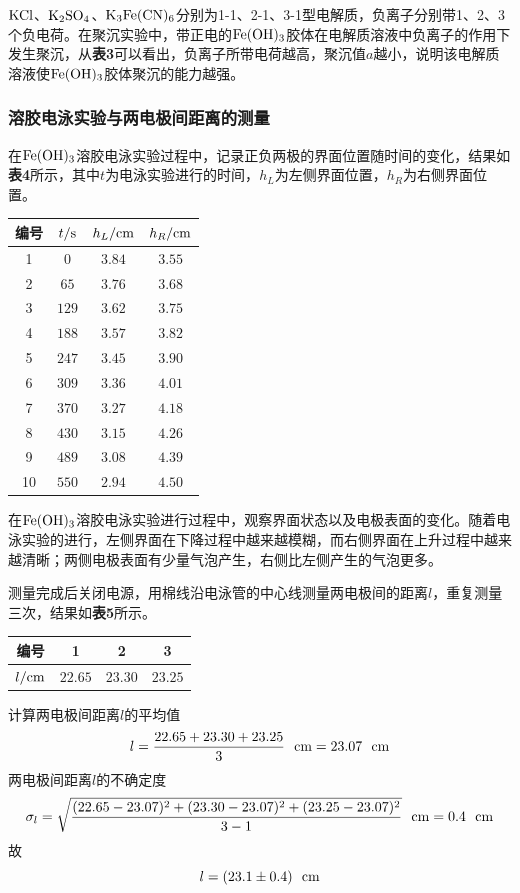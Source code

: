 \documentclass[12pt]{article}
\begin{document}
\par
$\rm KCl$、$\rm K_{2}SO_{4}$、$\rm K_{3}Fe(CN)_{6}$分别为1-1、2-1、3-1型电解质，负离子分别带1、2、3个负电荷。在聚沉实验中，带正电的$\rm Fe(OH)_{3}$胶体在电解质溶液中负离子的作用下发生聚沉，从\textbf{表3}可以看出，负离子所带电荷越高，聚沉值$a$越小，说明该电解质溶液使$\rm Fe(OH)_{3}$胶体聚沉的能力越强。
\subsubsection{溶胶电泳实验与两电极间距离的测量}
在$\rm Fe(OH)_{3}$溶胶电泳实验过程中，记录正负两极的界面位置随时间的变化，结果如\textbf{表4}所示，其中$t$为电泳实验进行的时间，$h_{L}$为左侧界面位置，$h_{R}$为右侧界面位置。
\begin{table}[h]
	\centering
	\begin{tabular}{cccc}
		\toprule
		编号 & $t/{\rm s}$ & $h_{L}/{\rm cm}$ & $h_{R}/{\rm cm}$  \\
		\midrule
		1 & $0$ & $3.84$ & $3.55$  \\
		2 & $65$ & $3.76$ & $3.68$  \\
		3 & $129$ & $3.62$ & $3.75$  \\
		4 & $188$ & $3.57$ & $3.82$  \\
		5 & $247$ & $3.45$ & $3.90$  \\
		6 & $309$ & $3.36$ & $4.01$  \\
	    7 & $370$ & $3.27$ & $4.18$  \\
	    8 & $430$ & $3.15$ & $4.26$  \\
	    9 & $489$ & $3.08$ & $4.39$  \\
	   10 & $550$ & $2.94$ & $4.50$  \\
		\bottomrule
	\end{tabular}
\end{table}
\par
在$\rm Fe(OH)_{3}$溶胶电泳实验进行过程中，观察界面状态以及电极表面的变化。随着电泳实验的进行，左侧界面在下降过程中越来越模糊，而右侧界面在上升过程中越来越清晰；两侧电极表面有少量气泡产生，右侧比左侧产生的气泡更多。\par 
测量完成后关闭电源，用棉线沿电泳管的中心线测量两电极间的距离$l$，重复测量三次，结果如\textbf{表5}所示。
\begin{table}[h]
	\centering
	\begin{tabular}{cccc}
		\toprule
		编号 & 1 & 2 & 3  \\
		\midrule
		 $l/{\rm cm}$& $22.65$ & $23.30$ & $23.25$  \\
		\bottomrule
	\end{tabular}
\end{table}
\par
计算两电极间距离$l$的平均值
$$
l=\frac{22.65+23.30+23.25}{3}\ \ {\rm cm}=23.07\ \ {\rm cm}
$$ 
两电极间距离$l$的不确定度
$$
\sigma_{l}=\sqrt{\frac{(22.65-23.07)^{2}+(23.30-23.07)^{2}+(23.25-23.07)^{2}}{3-1}}\ \ {\rm cm}=0.4\ \ {\rm cm}
$$
故
$$
l=(23.1\pm 0.4)\ \ {\rm cm}
$$
\vbox{}
\end{document}
